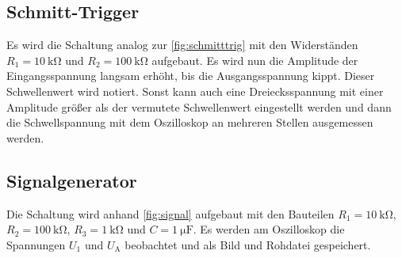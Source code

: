     \subsection{Schmitt-Trigger}

        \noindent 
        Es wird die Schaltung analog zur \autoref{fig:schmitttrig} mit den Widerständen $R_1 = \SI{10}{\kilo\ohm}$ und $R_2 = \SI{100}{\kilo\ohm}$ 
        aufgebaut. 
        Es wird nun die Amplitude der Eingangsspannung langsam erhöht, bis die Ausgangsspannung kippt. Dieser Schwellenwert wird notiert. 
        Sonst kann auch eine Dreiecksspannung mit einer Amplitude größer als der vermutete Schwellenwert eingestellt werden und dann die 
        Schwellspannung mit dem Oszilloskop an mehreren Stellen ausgemessen werden. 

    \subsection{Signalgenerator}

        \noindent 
        Die Schaltung wird anhand \autoref{fig:signal} aufgebaut mit den Bauteilen $R_1 = \SI{10}{\kilo\ohm}$, $R_2 = \SI{100}{\kilo\ohm}$, 
        $R_3 = \SI{1}{\kilo\ohm}$ und $C = \SI{1}{\micro\farad}$. 
        Es werden am Oszilloskop die Spannungen $U_1$ und $U_\text{A}$ beobachtet und als Bild und Rohdatei gespeichert. 